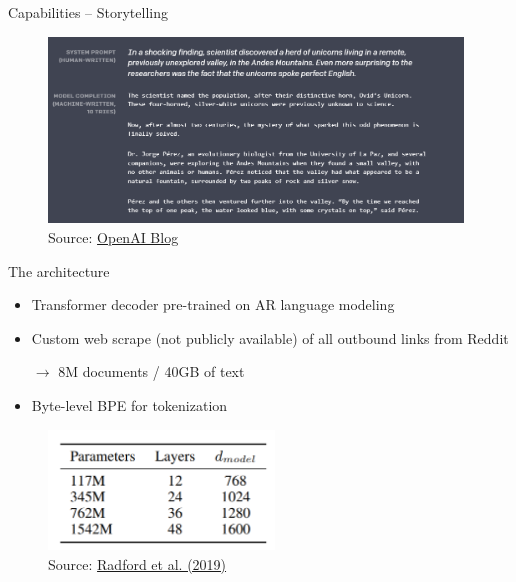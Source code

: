\begin{frame}{Capabilities -- Storytelling}

\vfill

\begin{figure}
\centering
\includegraphics[width = 11cm]{figure/gpt2-story.png}\\ 
\footnotesize{Source:} \href{https://openai.com/blog/better-language-models/\#sample1}{\footnotesize OpenAI Blog}
\end{figure}

\vfill

\end{frame}


\begin{frame}{The architecture}

\vfill

\begin{itemize}
	\item Transformer decoder pre-trained on AR language modeling
	\item Custom web scrape (not publicly available) of all outbound links from Reddit
	\item[$\to$] 8M documents / 40GB of text
	\item Byte-level BPE for tokenization
\end{itemize}

\begin{figure}
\centering
\includegraphics[width = 6cm]{figure/gpt2-size.png}\\ 
\footnotesize{Source:} \href{https://cdn.openai.com/better-language-models/language_models_are_unsupervised_multitask_learners.pdf}{\footnotesize Radford et al. (2019)}
\end{figure}

\vfill

\end{frame}


